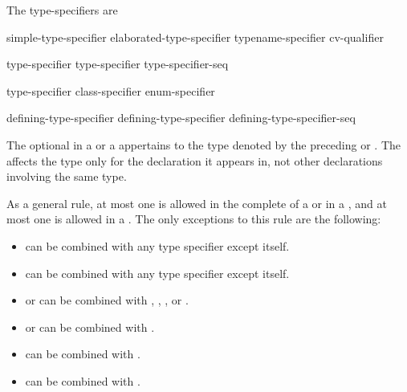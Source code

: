 \pnum
The type-specifiers are

%
%
%
\begin{bnf}
\br
  simple-type-specifier\br
  elaborated-type-specifier\br
  typename-specifier\br
  cv-qualifier
\end{bnf}

\begin{bnf}
\br
    type-specifier \br
    type-specifier type-specifier-seq
\end{bnf}

\begin{bnf}
\br
    type-specifier\br
    class-specifier\br
    enum-specifier
\end{bnf}

\begin{bnf}
\br
  defining-type-specifier \br
  defining-type-specifier defining-type-specifier-seq
\end{bnf}

The optional  in a 
or a 
appertains
to the type denoted by the preceding 
or . The
 affects the type only for the declaration it appears in,
not other declarations involving the same type.

\pnum
As a general rule, at most one
is allowed in the complete
 of a  or in a
,
and at most one
is allowed in a
.
The only exceptions to this rule are the following:

\begin{itemize}
\item {} can be combined with any type specifier except itself.

\item {} can be combined with any type specifier except itself.

\item {} or  can be combined with
, , , or .

\item {} or  can be combined with .

\item {} can be combined with .

\item {} can be combined with .
\end{itemize}

